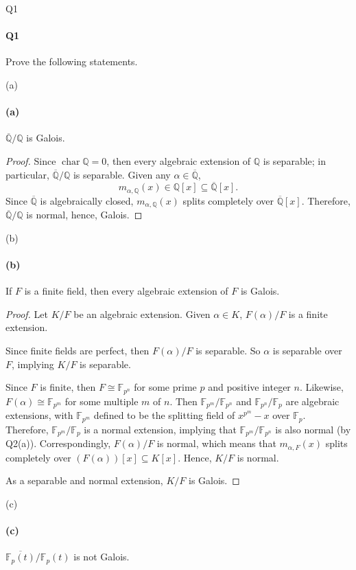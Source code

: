 \documentclass[12pt]{article}
\newenvironment{fullbox}{\begin{lrbox}{\savefullbox}\begin{minipage}{\dimexpr\textwidth-2\fboxsep\relax}}{\end{minipage}\end{lrbox}\begin{center}\framebox[\textwidth]{\usebox{\savefullbox}}\end{center}}
\newenvironment{pbox}[1][]{\begin{fullbox}\ifx#1\empty\else\paragraph{#1}\fi}{\end{fullbox}}
\newcommand{\Q}{\mathbb{Q}}
\newcommand{\<}{\langle}
\renewcommand{\>}{\rangle}
\newcommand{\isom}{\cong}
\newcommand{\clo}{\overline}
\DeclareMathOperator{\ch}{char}
\newcommand{\F}{\mathbb{F}}
\begin{document}
\thispagestyle{title}

\begin{pbox}[Q1]
    Prove the following statements.
\end{pbox}

\begin{pbox}[(a)]
    $\clo{\Q}/\Q$ is Galois.
\end{pbox}

\begin{proof}
    Since $\ch\Q = 0$, then every algebraic extension of $\Q$ is separable; in particular, $\clo{\Q}/\Q$ is separable. Given any $\alpha \in \clo{\Q}$,
    \[
        m_{\alpha, \Q}(x) \in \Q[x] \subseteq \clo{\Q}[x].
    \]
    Since $\clo{\Q}$ is algebraically closed, $m_{\alpha, \Q}(x)$ splits completely over $\clo{\Q}[x]$. Therefore, $\clo{\Q}/\Q$ is normal, hence, Galois.

\end{proof}

\begin{pbox}[(b)]
    If $F$ is a finite field, then every algebraic extension of $F$ is Galois.
\end{pbox}

\begin{proof}
    Let $K/F$ be an algebraic extension. Given $\alpha \in K$, $F(\alpha)/F$ is a finite extension.
    
    Since finite fields are perfect, then $F(\alpha)/F$ is separable. So $\alpha$ is separable over $F$, implying $K/F$ is separable. 

    Since $F$ is finite, then $F \isom \F_{p^n}$ for some prime $p$ and positive integer $n$. Likewise, $F(\alpha) \isom \F_{p^{m}}$ for some multiple $m$ of $n$. Then $\F_{p^m}/\F_{p^n}$ and $\F_{p^n}/\F_p$ are algebraic extensions, with $\F_{p^m}$ defined to be the splitting field of $x^{p^m} - x$ over $\F_p$. Therefore, $\F_{p^m}/\F_p$ is a normal extension, implying that $\F_{p^m}/\F_{p^n}$ is also normal (by Q2(a)). Correspondingly, $F(\alpha)/F$ is normal, which means that $m_{\alpha, F}(x)$ splits completely over $(F(\alpha))[x] \subseteq K[x]$. Hence, $K/F$ is normal.

    As a separable and normal extension, $K/F$ is Galois.

\end{proof}

\begin{pbox}[(c)]
    $\clo{\F_p(t)}/\F_p(t)$ is not Galois.
\end{pbox}
\end{document}
